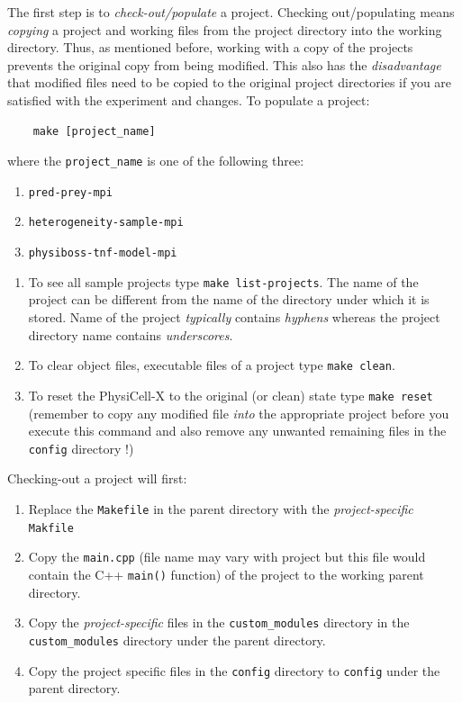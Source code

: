 \documentclass[12pt]{article}
\begin{document}
The first step is to \textit{check-out/populate} a project. Checking out/populating means \textit{copying} a project and working files from the project directory into the working directory. Thus, as mentioned before, working with a copy of the projects prevents the original copy from being modified. This also has the \textit{disadvantage} that modified files need to be copied to the original project directories if you are satisfied with the experiment and changes. To populate a project:
\begin{verbatim}
    make [project_name]
\end{verbatim}
where the \texttt{project\_name} is one of the following three:
\begin{enumerate}
    \item \texttt{pred-prey-mpi}
    \item \texttt{heterogeneity-sample-mpi}
    \item \texttt{physiboss-tnf-model-mpi}
\end{enumerate}

\begin{tcolorbox}[enhanced,attach boxed title to top center={yshift=-3mm,yshifttext=-1mm},
  colback=blue!5!white,colframe=blue!75!black,colbacktitle=red!80!black,
  title=\texttt{make} Help,fonttitle=\bfseries,
  boxed title style={size=small,colframe=red!50!black} ]
  \begin{enumerate}
     \item To see all sample projects type \texttt{make list-projects}. The name of the project can be different from the name of the directory under which it is stored. Name of the project \textit{typically} contains \textit{hyphens} whereas the project directory name contains \textit{underscores}. 
     \item To clear object files, executable files of a project type \texttt{make clean}.
     \item To reset the PhysiCell-X to the original (or clean) state type \texttt{make reset} (remember to copy any modified file \textit{into} the appropriate project before you execute this command and also remove any unwanted remaining files in the \texttt{config} directory !)
  \end{enumerate}
\end{tcolorbox}

Checking-out a project will first:
\begin{enumerate}
    \item Replace the \texttt{Makefile} in the parent directory with the \textit{project-specific} \texttt{Makfile}
    \item Copy the \texttt{main.cpp} (file name may vary with project but this file would contain the C++ \texttt{main()} function) of the project to the working parent directory.
    \item Copy the \textit{project-specific} files in the \texttt{custom\_modules} directory in the \texttt{custom\_modules} directory under the parent directory. 
    \item Copy the project specific files in the \texttt{config} directory to \texttt{config} under the parent directory. 
\end{enumerate}
\end{document}
